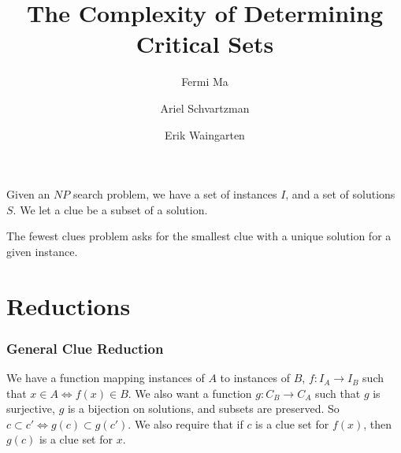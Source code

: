 \documentclass[runningheads,a4paper]{llncs}
\begin{document}
\mainmatter  %

\title{The Complexity of Determining Critical Sets}


%
%
\author{Fermi Ma \and Ariel Schvartzman \and Erik Waingarten}
%


%
%

\maketitle

Given an $NP$ search problem, we have a set of instances $I$, and a set of solutions $S$. We let a clue be a subset of a solution.

The fewest clues problem asks for the smallest clue with a unique solution for a given instance.

\section{Reductions}

\subsubsection{General Clue Reduction}
We have a function mapping instances of $A$ to instances of $B$, $f: I_A \rightarrow I_B$ such that $x \in A \iff f(x) \in B$. We also want a function $g: C_B \rightarrow C_A$ such that $g$ is surjective, $g$ is a bijection on solutions, and subsets are preserved. So $c \subset c' \iff g(c) \subset g(c')$. We also require that if $c$ is a clue set for $f(x)$, then $g(c)$ is a clue set for $x$. 
\end{document}

